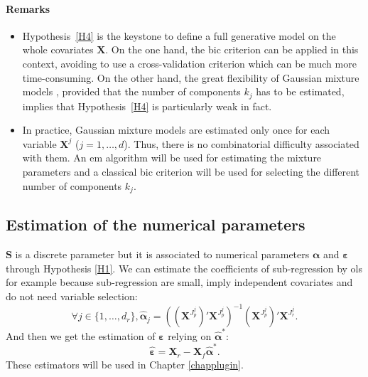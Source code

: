 \documentclass[12pt,a4paper]{report}
\begin{document}
	
\paragraph{Remarks}\begin{itemize}
	\item Hypothesis~\ref{H4} is the keystone to define a full generative model on the whole covariates $\boldsymbol{X}$. On the one hand, the {\sc bic} criterion can be applied in this context, avoiding to use a cross-validation criterion which can be much more time-consuming. On the other hand, the great flexibility  of Gaussian mixture models \cite{mclachlan2004finite}, provided that the number of components $k_j$ has to be estimated, implies that Hypothesis~\ref{H4} is particularly weak in fact.
\item In practice, Gaussian mixture models are estimated only once for each variable $\boldsymbol{X}^j$ ($j=1,\ldots,d$). Thus, there is no combinatorial difficulty associated with them. An {\sc em} algorithm \cite{dempster1977maximum} will be used for estimating the mixture parameters and a classical {\sc bic} criterion \cite{Sch1978} will be used for selecting the different number of components $k_j$.
\end{itemize}	
	
	

\subsection{Estimation of the numerical parameters}
	$\boldsymbol{S}$ is a discrete parameter but it is associated to numerical parameters $\boldsymbol{\alpha}$ and $\boldsymbol{\varepsilon}$ through Hypothesis \ref{H1}.
	We can estimate the coefficients of sub-regression by {\sc ols} for example because sub-regression are small, imply independent covariates and do not need variable selection:
	\begin{equation}
	 \forall j \in \{1,\dots,d_r \}, \hat{\boldsymbol{\alpha}}_j=((\boldsymbol{X}^{J_p^j})' \boldsymbol{X}^{J_p^j})^{-1} (\boldsymbol{X}^{J_p^j})'\boldsymbol{X}^{J_r^j} .\label{estimalpha}
\end{equation}	 
And then we get the estimation of $\boldsymbol{\varepsilon}$ relying on $\hat{\boldsymbol{\alpha}}^*$:
	\begin{equation}
		\hat{\boldsymbol{\varepsilon}}=\boldsymbol{X}_r-\boldsymbol{X}_f\hat{\boldsymbol{\alpha}}^* .\label{epsilonchapeau}
	\end{equation}
	These estimators will be used in Chapter \ref{chapplugin}.
\end{document}
